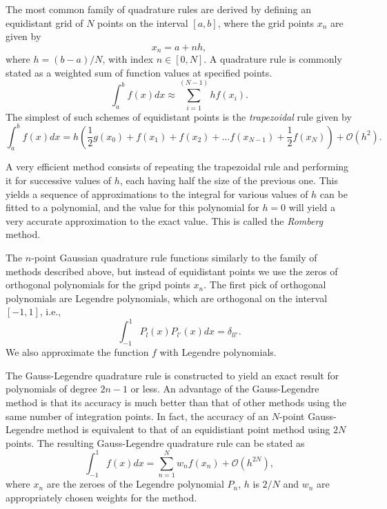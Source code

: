     The most common family of quadrature rules are derived by 
    defining an equidistant grid of $N$ points on the interval $[a,b]$,
    where the grid points $x_n$ are given by 
    \begin{equation}
        x_n = a + nh,
    \end{equation}
    where $h = (b - a)/N$, with index $n\in[0, N]$. A quadrature rule is commonly stated 
    as a weighted sum of function values at specified points. 
    \begin{equation*}
        \int_a^b f(x) dx \approx \sum_{i=1}^{(N-1)} h f(x_i).
    \end{equation*}
    The simplest of such schemes of equidistant points is the \emph{trapezoidal} rule 
    given by 
    \begin{equation}
        \int_a^b f(x) dx = 
            h \left(\frac{1}{2}g(x_0) + f(x_1) + f(x_2) + \dots 
                f(x_{N-1}) + \frac{1}{2}f(x_N) \right) + \mathscr{O}(h^2).
    \end{equation}

    A very efficient method consists of repeating the trapezoidal rule and 
    performing it for successive values of $h$, each having half the size of the 
    previous one. This yields a sequence of approximations to the integral for various 
    values of $h$ can be fitted to a polynomial, and the value for this polynomial 
    for $h=0$ will yield a very accurate approximation to the exact value. This is
    called the \emph{Romberg} method.

    The $n$-point Gaussian quadrature rule functions similarly to the family of methods 
    described above, but instead of equidistant points we use the zeros of 
    orthogonal polynomials for the gripd points $x_n$. The first pick of orthogonal 
    polynomials are Legendre polynomials, which are orthogonal on the interval $[-1,1]$,
    i.e.,
    \begin{equation}
        \int_{-1}^1 P_l(x) P_{l'}(x) dx = \delta_{ll'}.
    \end{equation}
    We also approximate the function $f$ with Legendre polynomials. 
    
    The Gauss-Legendre quadrature rule is constructed to yield an exact 
    result for polynomials of degree $2n-1$ or less. An advantage of the Gauss-Legendre 
    method is that its accuracy is much better than that of other methods using the 
    same number of integration points. In fact, the accuracy of an $N$-point Gauss-Legendre 
    method is equivalent to that of an equidistiant point method using $2N$ points.
    The resulting Gauss-Legendre quadrature rule can be stated as 
    \begin{equation}
        \int_{-1}^1 f(x) dx = \sum_{n=1}^N w_n f(x_n) + \mathscr{O}(h^{2N}),
    \end{equation}
    where $x_n$ are the zeroes of the Legendre polynomial $P_n$, $h$ is $2/N$ and 
    $w_n$ are appropriately chosen weights for the method.
    
